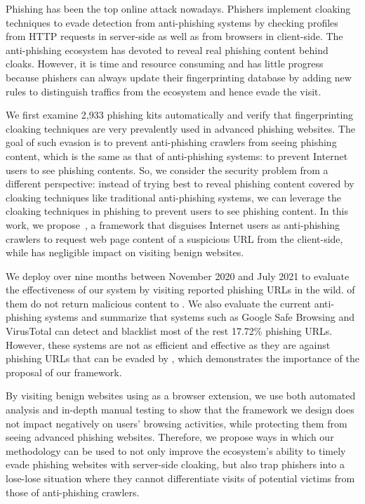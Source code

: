 Phishing has been the top online attack nowadays.
Phishers implement cloaking techniques to evade detection from anti-phishing systems by checking profiles from HTTP requests in server-side as well as from browsers in client-side.
The anti-phishing ecosystem has devoted to reveal real phishing content behind cloaks.
However, it is time and resource consuming and has little progress because phishers can always update their fingerprinting database by adding new rules to distinguish traffics from the ecosystem and hence evade the visit.

We first examine 2,933 phishing kits automatically and verify that fingerprinting cloaking techniques are very prevalently used in advanced phishing websites.
The goal of such evasion is to prevent anti-phishing crawlers from seeing phishing content, which is the same as that of anti-phishing systems:
to prevent Internet users to see phishing contents.
So, we consider the security problem from a different perspective:
instead of trying best to reveal phishing content covered by cloaking techniques like traditional anti-phishing systems, we can leverage the cloaking techniques in phishing to prevent users to see phishing content.
In this work, we propose~\spartacus, a framework that disguises Internet users as anti-phishing crawlers to request web page content of a suspicious URL from the client-side, while has negligible impact on visiting benign websites.



We deploy \spartacus over nine months between November 2020 and July 2021 to evaluate the effectiveness of our system by visiting \totalphishing reported phishing URLs in the wild.
\evadedphishing of them do not return malicious content to \spartacus.
We also evaluate the current anti-phishing systems and summarize that systems such as Google Safe Browsing and VirusTotal can detect and blacklist most of the rest 17.72\% phishing URLs.
However, these systems are not as efficient and effective as they are against phishing URLs that can be evaded by \spartacus,
which demonstrates the importance of the proposal of our framework.

By visiting benign websites using \spartacus as a browser extension, we use both automated analysis and in-depth manual testing to show that the framework we design does not impact negatively on users' browsing activities, while protecting them from seeing advanced phishing websites.
Therefore, we propose ways in which our methodology can be used to not only improve the ecosystem’s ability to timely evade phishing websites with server-side cloaking, but also trap phishers into a lose-lose situation where they cannot differentiate visits of potential victims from those of anti-phishing crawlers.
